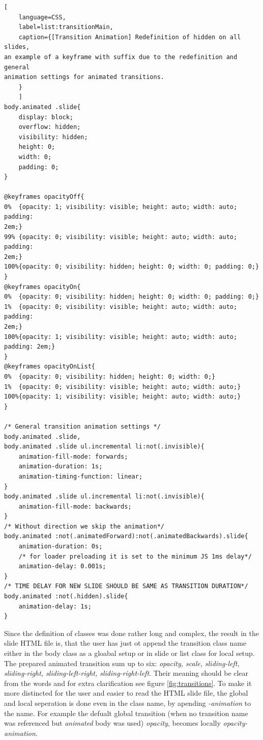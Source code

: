 \begin{minipage}{\linewidth}
	\begin{lstlisting}[
	language=CSS,
	label=list:transitionMain,
	caption={[Transition Animation] Redefinition of hidden on all slides, 
an example of a keyframe with suffix due to the redefinition and general 
animation settings for animated transitions.
	}
	]
body.animated .slide{
	display: block;
	overflow: hidden;
	visibility: hidden;
	height: 0;
	width: 0;
	padding: 0;
}

@keyframes opacityOff{
0%	{opacity: 1; visibility: visible; height: auto; width: auto; padding: 
2em;}
99%	{opacity: 0; visibility: visible; height: auto; width: auto; padding: 
2em;}
100%{opacity: 0; visibility: hidden; height: 0; width: 0; padding: 0;}
}
@keyframes opacityOn{
0%	{opacity: 0; visibility: hidden; height: 0; width: 0; padding: 0;}
1%	{opacity: 0; visibility: visible; height: auto; width: auto; padding: 
2em;}
100%{opacity: 1; visibility: visible; height: auto; width: auto; padding: 2em;}
}
@keyframes opacityOnList{
0%	{opacity: 0; visibility: hidden; height: 0;	width: 0;}
1%	{opacity: 0; visibility: visible; height: auto; width: auto;}
100%{opacity: 1; visibility: visible; height: auto; width: auto;}
}

/* General transition animation settings */
body.animated .slide,
body.animated .slide ul.incremental li:not(.invisible){
	animation-fill-mode: forwards;
	animation-duration: 1s;
	animation-timing-function: linear;
}
body.animated .slide ul.incremental li:not(.invisible){
	animation-fill-mode: backwards;
}
/* Without direction we skip the animation*/
body.animated :not(.animatedForward):not(.animatedBackwards).slide{
	animation-duration: 0s;
	/* for loader preloading it is set to the minimum JS 1ms delay*/
	animation-delay: 0.001s;
}
/* TIME DELAY FOR NEW SLIDE SHOULD BE SAME AS TRANSITION DURATION*/
body.animated :not(.hidden).slide{
	animation-delay: 1s;		
}

	\end{lstlisting}
\end{minipage}

Since the definition of classes was done rather long and complex, the result in 
the slide HTML file is, that the user has just ot append the transition class 
name either in the body class as a gloabal setup or in slide or list class for 
local setup. The prepared 
animated transition sum up to six: \textit{opacity, scale, sliding-left, 
sliding-right, sliding-left-right, sliding-right-left}. Their meaning should be 
clear from the words and for extra clarification see figure 
\ref{fig:transitions}. To make it more distincted for the user and easier to 
read the HTML slide file, the global and local seperation is done even in the 
class name, by apending \textit{-animation} to the name. For example the 
defualt global transition (when no transition name was referenced but 
\textit{animated} body was used) \textit{opacity}, becomes locally 
\textit{opacity-animation}.

